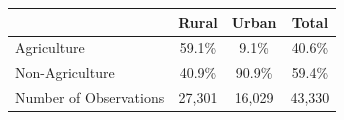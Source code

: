 \begin{tabular*}{0.7\textwidth}{@{\hskip\tabcolsep\extracolsep\fill}l*{3}{c}}
\toprule
            &       Rural&       Urban&       Total\\
\midrule
Agriculture &     59.1\%&      9.1\%&     40.6\%\\
Non-Agriculture&     40.9\%&     90.9\%&     59.4\%\\
Number of Observations&      27,301&      16,029&      43,330\\
\bottomrule
\end{tabular*}
